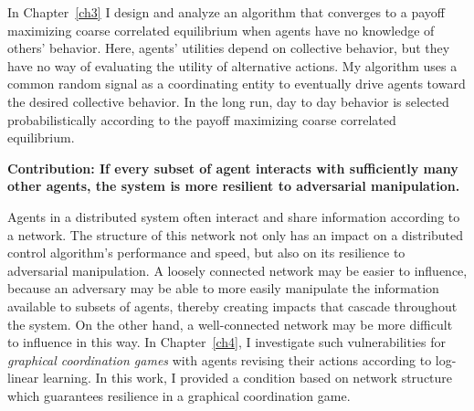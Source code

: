 In Chapter~\ref{ch3} I design and analyze an algorithm that converges to a payoff maximizing coarse correlated equilibrium when agents have no knowledge of others' behavior. Here, agents' utilities depend on collective behavior, but they have no way of evaluating the utility of alternative actions. My algorithm uses a common random signal as a coordinating entity to eventually drive agents toward the desired collective behavior. In the long run, day to day behavior is selected probabilistically according to the payoff maximizing coarse correlated equilibrium.

 


\smallskip

 \noindent\textbf{Contribution: If every subset of agent interacts with sufficiently many other agents, the system is more resilient to adversarial manipulation.}


Agents in a distributed system often interact and share information according to a network. The structure of this network not only has an impact on a distributed control algorithm's performance and speed, but also on its resilience to adversarial manipulation. A loosely connected network may be easier to influence, because an adversary may be able to more easily manipulate the information available to subsets of agents, thereby creating impacts that cascade throughout the system. On the other hand, a well-connected network may be more difficult to influence in this way. In Chapter~\ref{ch4}, I investigate such vulnerabilities for  {\it graphical coordination games} \cite{Ullmann1977,Cooper1999} with agents revising their actions according to log-linear learning. In this work, I provided a condition based on network structure which guarantees resilience in a graphical coordination game. 


